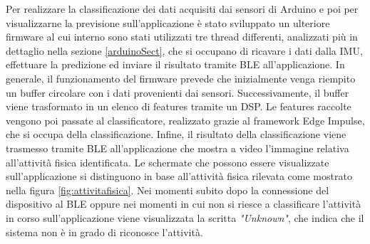 Per realizzare la classificazione dei dati acquisiti dai sensori di Arduino e poi per visualizzarne la previsione sull'applicazione è stato sviluppato un ulteriore firmware al cui interno sono stati utilizzati tre thread differenti, analizzati più in dettaglio nella sezione \ref{arduinoSect}, che si occupano di ricavare i dati dalla IMU, effettuare la predizione ed inviare il risultato tramite BLE all'applicazione. In generale, il funzionamento del firmware prevede che inizialmente venga riempito un buffer circolare con i dati provenienti dai sensori. Successivamente, il buffer viene trasformato in un elenco di features tramite un DSP. Le features raccolte vengono poi passate al classificatore, realizzato grazie al framework Edge Impulse, che si occupa della classificazione. Infine, il risultato della classificazione viene trasmesso tramite BLE all'applicazione che mostra a video l'immagine relativa all'attività fisica identificata. Le schermate che possono essere visualizzate sull'applicazione si distinguono in base all'attività fisica rilevata come mostrato nella figura \ref{fig:attivitafisica}. Nei momenti subito dopo la connessione del dispositivo al BLE oppure nei momenti in cui non si riesce a classificare l'attività in corso sull'applicazione viene visualizzata la scritta \textit{"Unknown"}, che indica che il sistema non è in grado di riconosce l'attività.
